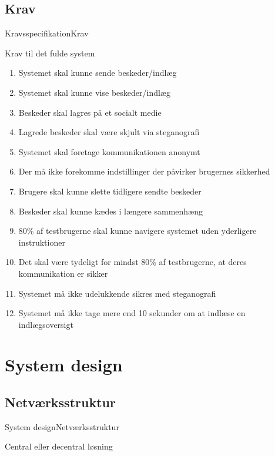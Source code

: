 \documentclass[10pt]{beamer}
\begin{document}
        \subsection{Krav}
        \begin{frame}{Kravsspecifikation}{Krav}
            \begin{block}{Krav til det fulde system}
                \begin{enumerate}
                    \footnotesize
                    \item \alert{Systemet skal kunne sende beskeder/indlæg}
                    \item \alert{Systemet skal kunne vise beskeder/indlæg}
                    \item \alert{Beskeder skal lagres på et socialt medie}
                    \item \alert{Lagrede beskeder skal være skjult via steganografi}
                    \item \alert{Systemet skal foretage kommunikationen anonymt}
                    \item \alert{Der må ikke forekomme indstillinger der påvirker brugernes sikkerhed}
                    \item Brugere skal kunne slette tidligere sendte beskeder
                    \item Beskeder skal kunne kædes i længere sammenhæng
                    \item 80\% af testbrugerne skal kunne navigere systemet uden yderligere instruktioner
                    \item Det skal være tydeligt for mindst 80\% af testbrugerne, at deres kommunikation er sikker
                    \item Systemet må ikke udelukkende sikres med steganografi
                    \item Systemet må ikke tage mere end 10 sekunder om at indlæse en indlægsoversigt
                \end{enumerate}
            \end{block}
        \end{frame}
    
    \section{System design}
    
        \subsection{Netværksstruktur}
        \begin{frame}{System design}{Netværksstruktur}
            \begin{block}{Central eller decentral løsning}
            
            \end{block}
        \end{frame}
        
\end{document}
